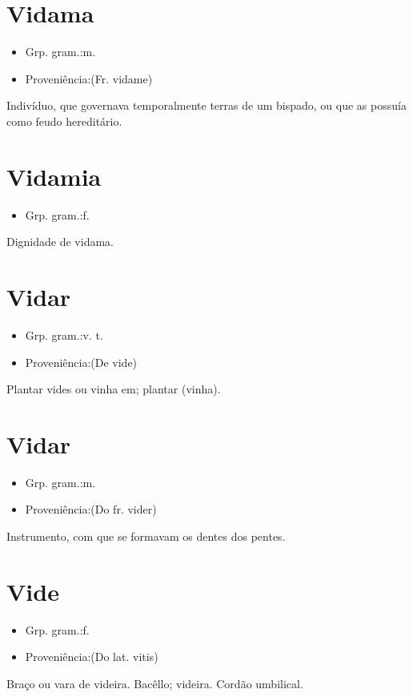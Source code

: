 \documentclass{article}
\begin{document}
\section{Vidama}
\begin{itemize}
\item {Grp. gram.:m.}
\end{itemize}
\begin{itemize}
\item {Proveniência:(Fr. \textunderscore vidame\textunderscore )}
\end{itemize}
Indivíduo, que governava temporalmente terras de um bispado, ou que as possuía como feudo hereditário.
\section{Vidamia}
\begin{itemize}
\item {Grp. gram.:f.}
\end{itemize}
Dignidade de vidama.
\section{Vidar}
\begin{itemize}
\item {Grp. gram.:v. t.}
\end{itemize}
\begin{itemize}
\item {Proveniência:(De \textunderscore vide\textunderscore )}
\end{itemize}
Plantar vides ou vinha em; plantar (vinha).
\section{Vidar}
\begin{itemize}
\item {Grp. gram.:m.}
\end{itemize}
\begin{itemize}
\item {Proveniência:(Do fr. \textunderscore vider\textunderscore )}
\end{itemize}
Instrumento, com que se formavam os dentes dos pentes.
\section{Vide}
\begin{itemize}
\item {Grp. gram.:f.}
\end{itemize}
\begin{itemize}
\item {Proveniência:(Do lat. \textunderscore vitis\textunderscore )}
\end{itemize}
Braço ou vara de videira.
Bacêllo; videira.
Cordão umbilical.
\end{document}
